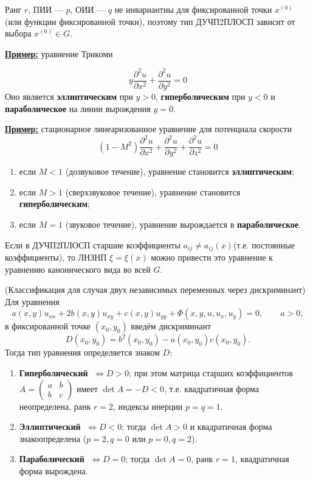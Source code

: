\begin{note}
	Ранг $r$, ПИИ --- $p$, ОИИ --- $q$ не инвариантны для фиксированной точки $x^{(0)}$ (или функции фиксированной точки), поэтому тип ДУЧП2ПЛОСП зависит от выбора $x^{(0)} \in G$.
\end{note}

\textbf{\underline{Пример:}} уравнение Трикоми

\[
	y \frac{\partial^2 u}{\partial x^2} + \frac{\partial^2 u}{\partial y^2} = 0
\]
Оно является \textbf{эллиптическим} при $y > 0$, \textbf{гиперболическим} при $y < 0$ и \textbf{параболическое} на линии вырождения $y = 0$.

\textbf{\underline{Пример:}} стационарное линеаризованное уравнение для потенциала скорости
\[
	(1-M^2) \frac{\partial^2 u}{\partial x^2} + \frac{\partial^2 u}{\partial y^2} + \frac{\partial^2 u}{\partial z^2} = 0
\]
\begin{enumerate}[nosep]
	\item если \(M<1\) (дозвуковое течение), уравнение становится \textbf{эллиптическим};
	\item если \(M>1\) (сверхзвуковое течение), уравнение становится \textbf{гиперболическим};
	\item если \(M=1\) (звуковое течение), уравнение вырождается в \textbf{параболическое}.
\end{enumerate}

\begin{note}
	Если в ДУЧП2ПЛОСП старшие коэффициенты $a_{ij} \neq a_{ij}(x)$(т.е. постоянные коэффициенты), то ЛНЗНП $\xi=\xi(x)$ можно привести это уравнение к уравнению канонического вида во всей $G$.
\end{note}

\begin{note}(Классификация для случая двух независимых переменных через дискриминант)\\
	Для уравнения
	\[
		a(x,y)u_{xx}+2b(x,y)u_{xy}+c(x,y)u_{yy}+\Phi(x,y,u,u_x,u_y)=0,\qquad a>0,
	\]
	в фиксированной точке $(x_0,y_0)$ введём дискриминант
	\[
		D(x_0,y_0)=b^2(x_0,y_0)-a(x_0,y_0)c(x_0,y_0).
	\]
	Тогда тип уравнения определяется знаком $D$:

	\begin{enumerate}[label=\arabic*)]
		\item \textbf{Гиперболический} $\; \Longleftrightarrow D>0$;
		      при этом матрица старших коэффициентов $A=\begin{pmatrix}a&b\\b&c\end{pmatrix}$ имеет $\det A = -D<0$, т.е. квадратичная форма неопределена, ранк $r=2$, индексы инерции $p=q=1$.

		\item \textbf{Эллиптический} $\; \Longleftrightarrow D<0$;
		      тогда $\det A>0$ и квадратичная форма знакоопределена ($p=2,q=0$ или $p=0,q=2$).

		\item \textbf{Параболический} $\; \Longleftrightarrow D=0$;
		      тогда $\det A=0$, ранк $r=1$, квадратичная форма вырождена.
	\end{enumerate}
\end{note}


